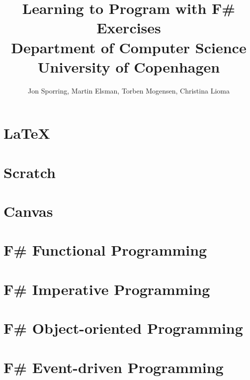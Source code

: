 \documentclass[a4paper,12pt]{report}
\title{Learning to Program with F\#\\Exercises\\Department of Computer
  Science\\University of Copenhagen}
\author{Jon Sporring, Martin Elsman, Torben Mogensen, Christina Lioma}
\begin{document}
\maketitle
\tableofcontents
\newpage
\chapter{\LaTeX}


\chapter{Scratch}



\chapter{Canvas}



\chapter{F\# Functional Programming}


























\chapter{F\# Imperative Programming}








\chapter{F\# Object-oriented Programming}












\chapter{F\# Event-driven Programming}




\end{document}
